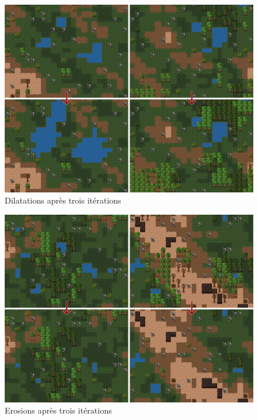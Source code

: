 \documentclass[a4paper]{memoir}
\begin{document}
			\begin{figure}
				\begin{center}
					\includegraphics[scale=0.2]{img/Dilatation.png}
				\end{center}
				\label{fig:dilatation}
				\caption{Dilatations après trois itérations}
			\end{figure}
			\begin{figure}
				\begin{center}
					\includegraphics[scale=0.2]{img/Erosion.png}
				\end{center}
				\label{fig:erosion}
				\caption{Erosions après trois itérations}
			\end{figure}
\end{document}

